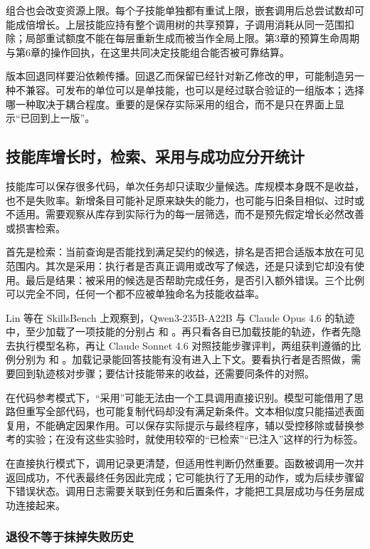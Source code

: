 组合也会改变资源上限。每个子技能单独都有重试上限，嵌套调用后总尝试数却可能成倍增长。上层技能应持有整个调用树的共享预算，子调用消耗从同一范围扣除；局部重试额度不能在每层重新生成而被当作全局上限。第3章的预算生命周期与第6章的操作回执，在这里共同决定技能组合能否被可靠结算。

版本回退同样要沿依赖传播。回退乙而保留已经针对新乙修改的甲，可能制造另一种不兼容。可发布的单位可以是单技能，也可以是经过联合验证的一组版本；选择哪一种取决于耦合程度。重要的是保存实际采用的组合，而不是只在界面上显示“已回到上一版”。


\subsection{技能库增长时，检索、采用与成功应分开统计}
\label{sec:ch08-library-growth}

技能库可以保存很多代码，单次任务却只读取少量候选。库规模本身既不是收益，也不是失败率。新增条目可能补足原来缺失的能力，也可能与旧条目相似、过时或不适用。需要观察从库存到实际行为的每一层筛选，而不是预先假定增长必然改善或损害检索。

首先是检索：当前查询是否能找到满足契约的候选，排名是否把合适版本放在可见范围内。其次是采用：执行者是否真正调用或改写了候选，还是只读到它却没有使用。最后是结果：被采用的候选是否帮助完成任务，是否引入额外错误。三个比例可以完全不同，任何一个都不应被单独命名为技能收益率。

Lin 等在 SkillsBench 上观察到，Qwen3-235B-A22B 与 Claude Opus 4.6 的轨迹中，至少加载了一项技能的分别占  和 \cite{harness-updating-benefit-2605}。再只看各自已加载技能的轨迹，作者先隐去执行模型名称，再让 Claude Sonnet 4.6 对照技能步骤评判，两组获判遵循的比例分别为  和 。加载记录能回答技能有没有进入上下文。要看执行者是否照做，需要回到轨迹核对步骤；要估计技能带来的收益，还需要同条件的对照。

在代码参考模式下，“采用”可能无法由一个工具调用直接识别。模型可能借用了思路但重写全部代码，也可能复制代码却没有满足新条件。文本相似度只能描述表面复用，不能确定因果作用。可以保存实际提示与最终程序，辅以受控移除或替换参考的实验；在没有这些实验时，就使用较窄的“已检索”“已注入”这样的行为标签。

在直接执行模式下，调用记录更清楚，但适用性判断仍然重要。函数被调用一次并返回成功，不代表最终任务因此完成；它可能执行了无用的动作，或为后续步骤留下错误状态。调用日志需要关联到任务和后置条件，才能把工具层成功与任务层成功连接起来。

\subsubsection{退役不等于抹掉失败历史}

